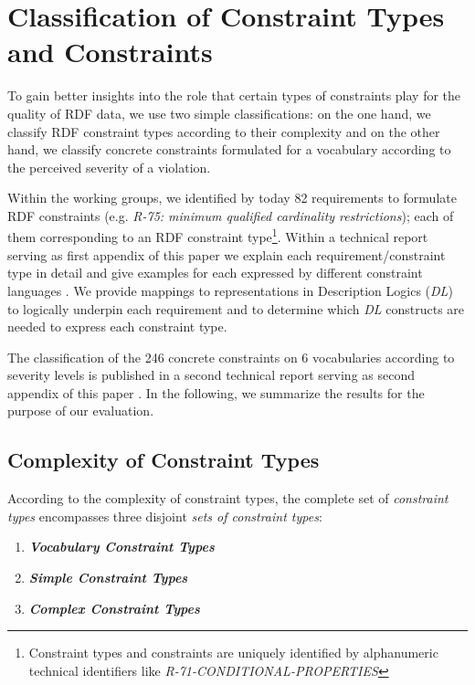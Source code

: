 \documentclass{llncs}
\begin{document}
\section{Classification of Constraint Types and Constraints}
\label{classification}

To gain better insights into the role that certain types of constraints play for the quality of RDF data, we use two simple classifications: on the one hand, we classify RDF constraint types according to their complexity and on the other hand, we classify concrete constraints formulated for a vocabulary according to the perceived severity of a violation. 

Within the working groups, we identified by today 82 requirements to formulate RDF constraints (e.g. \emph{R-75: minimum qualified cardinality restrictions}); each of them corresponding to an RDF constraint type\footnote{Constraint types and constraints are uniquely identified by alphanumeric technical identifiers like \emph{R-71-CONDITIONAL-PROPERTIES}}. 
Within a technical report serving as first appendix of this paper we explain each requirement/constraint type in detail and give examples for each expressed by different constraint languages \cite{BoschNolleAcarEckert2015}. We provide mappings to representations in Description Logics (\emph{DL}) to logically underpin each requirement and to determine which \emph{DL} constructs are needed to express each constraint type.




The classification of the 246 concrete constraints on 6 vocabularies according to severity levels is published in a second technical report serving as second appendix of this paper \cite{BoschZapilkoWackerowEckert2015}.
In the following, we summarize the results for the purpose of our evaluation.

\subsection{Complexity of Constraint Types}

According to the complexity of constraint types, the complete set of \emph{constraint types} encompasses three disjoint \emph{sets of constraint types}:
\begin{enumerate}
	\item \textbf{\emph{Vocabulary Constraint Types}}
	\item \textbf{\emph{Simple Constraint Types}}
	\item \textbf{\emph{Complex Constraint Types}}
\end{enumerate}
\end{document}
